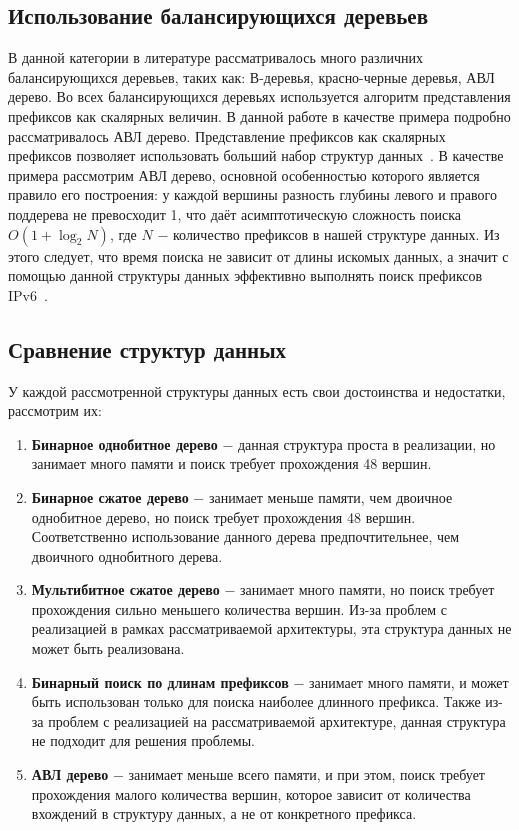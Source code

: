 \documentclass[9pt,a4paper]{article}
\begin{document}
        \subsection{Использование балансирующихся деревьев}
            \label{section:avlrev}
            В данной категории в литературе рассматривалось много различних балансирующихся деревьев, таких как: В-деревья,
            красно-черные деревья, АВЛ дерево. Во всех балансирующихся деревьях используется алгоритм представления префиксов
            как скалярных величин.
            В данной работе в качестве примера подробно рассматривалось АВЛ дерево.
            Представление префиксов как скалярных префиксов позволяет использовать больший набор структур данных~\cite{behdadfar2009scalar}. 
            В качестве примера рассмотрим АВЛ дерево, основной особенностью которого является правило его построения: у каждой вершины разность 
            глубины левого и правого поддерева не превосходит 1, что даёт асимптотическую сложность поиска {\ttfamily $O(1+\log_2{N})$}, 
            где {\ttfamily $N$} $-$ количество префиксов в нашей структуре данных. Из этого следует, что время поиска не зависит от длины искомых данных,
            а значит с помощью данной структуры данных эффективно выполнять поиск префиксов IPv6~\cite{behdadfar2011coded}.
            \\
    \subsection{Сравнение структур данных}
        У каждой рассмотренной структуры данных есть свои достоинства и недостатки, рассмотрим их:
        \begin{enumerate}
            \item \textbf{Бинарное однобитное дерево} $-$ данная структура проста в реализации, но занимает много памяти и поиск требует прохождения 48 вершин.
            \item \textbf{Бинарное сжатое дерево} $-$ занимает меньше памяти, чем двоичное однобитное дерево, но поиск требует прохождения 48 вершин. 
                Соответственно использование данного дерева предпочтительнее, чем двоичного однобитного дерева.
            \item \textbf{Мультибитное сжатое дерево} $-$ занимает много памяти, но поиск требует прохождения сильно меньшего количества вершин. 
                Из-за проблем с реализацией в рамках рассматриваемой архитектуры, эта структура данных не может быть реализована.
            \item \textbf{Бинарный поиск по длинам префиксов} $-$ занимает много памяти, и может быть использован только для поиска наиболее длинного префикса.
                Также из-за проблем с реализацией на рассматриваемой архитектуре, данная структура не подходит для решения проблемы.
            \item \textbf{АВЛ дерево} $-$ занимает меньше всего памяти, и при этом, поиск требует прохождения малого количества вершин,
                которое зависит от количества вхождений в структуру данных, а не от конкретного префикса.
        \end{enumerate}
\end{document}
